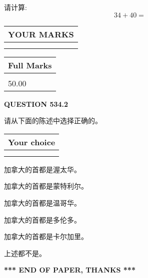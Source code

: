 \documentclass{ctexart}
\begin{document}
  
 
请计算:
\begin{equation}
34 +  %
40 = \nonumber
\end{equation}
 

 

 
  
\vspace{0.2in}
  
\noindent\begin{tabular}{|l|}
\hline
 YOUR MARKS  \\
\hline
 \\ 
 \\ 
\hline
\end{tabular}
\hspace{0.05in} \begin{tabular}{|l|}
\hline
 Full Marks  \\
\hline
 \\ 
50.00 \\
\hline
\end{tabular}
{\textbf{\Large{QUESTION
534.2 
}}}
  
  
请从下面的陈述中选择正确的。
  
  
\noindent\hspace{3.0in} \begin{tabular}{|l|}
\hline
Your choice \\
\hline
 \\ 
 \\ 
\hline
\end{tabular}
  
  
 
 
加拿大的首都是渥太华。
 
 
加拿大的首都是蒙特利尔。
 
 
加拿大的首都是温哥华。
 
 
加拿大的首都是多伦多。
 
 
加拿大的首都是卡尔加里。
 
 
 上述都不是。
 
 
   
   
 \vspace{0.2in}
 
   
   
   
   
\vspace{1.0in} 
{\textbf{\large{ *** END OF PAPER, THANKS *** }}} 
   
\end{document}
